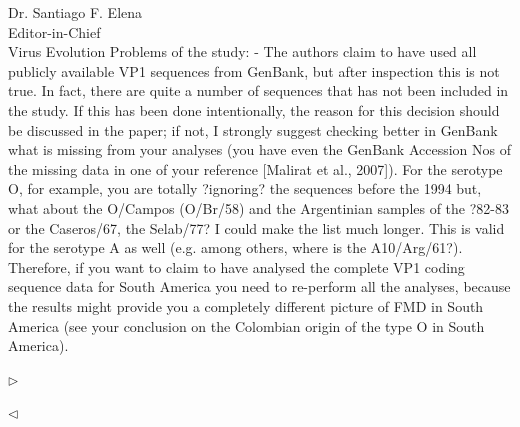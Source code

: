 \documentclass[ucla,biomath,12pt,noaddrfooter,datefrom]{UC_letter}
\newenvironment{reply}{$\triangleright$\bf}{$\triangleleft$}
\begin{document}
\begin{letter}{
Dr. Santiago F. Elena \\
Editor-in-Chief \\
Virus Evolution
}
Problems of the study:
-       The authors claim to have used all publicly available VP1 sequences from GenBank, but after inspection this is not true. 
In fact, there are quite a number of sequences that has not been included in the study. If this has been done intentionally, the reason for this decision should be discussed in the paper; if not, I strongly suggest checking better in GenBank what is missing from your analyses (you have even the GenBank Accession Nos of the missing data in one of your reference [Malirat et al., 2007]). 
For the serotype O, for example, you are totally ?ignoring? the sequences before the 1994 but, what about the O/Campos (O/Br/58) and the Argentinian samples of the ?82-83 or the Caseros/67, the Selab/77? I could make the list much longer. 
This is valid for the serotype A as well (e.g. among others, where is the A10/Arg/61?). 
Therefore, if you want to claim to have analysed the complete VP1 coding sequence data for South America you need to re-perform all the analyses, because the results might provide you a completely different picture of FMD in South America (see your conclusion on the Colombian origin of the type O in South America).

\begin{reply}

\end{reply}


\end{letter}
\end{document}
